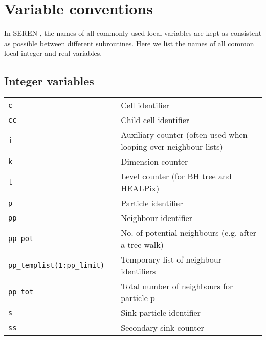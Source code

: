 \documentclass[a4paper]{article}
\newcommand{\NAME}{SEREN }
\newcommand{\var}[1]{\texttt{#1}}
\begin{document}
\section{Variable conventions}
In \NAME, the names of all commonly used local variables are kept as 
consistent as possible between different subroutines.  
Here we list the names of all common local integer and real variables.  

\subsection{Integer variables}
\begin{tabular}{lll}
\var{c}  &  &  Cell identifier \\
\var{cc} &  &  Child cell identifier \\
\var{i}  &  &  Auxiliary counter (often used when looping over neighbour lists) \\
\var{k}  &  &  Dimension counter \\
\var{l}  &  &  Level counter (for BH tree and HEALPix) \\
\var{p}  &  &  Particle identifier  \\
\var{pp} &  &  Neighbour identifier \\
\var{pp\_pot} & & No. of potential neighbours (e.g. after a tree walk) \\
\var{pp\_templist(1:pp\_limit)} &  & Temporary list of neighbour identifiers \\
\var{pp\_tot} & & Total number of neighbours for particle p \\
\var{s}  &  &  Sink particle identifier \\
\var{ss} &  &  Secondary sink counter
\end{tabular}
\end{document}
